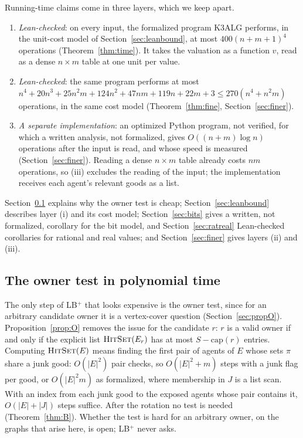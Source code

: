 \documentclass[runningheads,11pt]{llncs}
\newcommand{\LBp}{\texorpdfstring{\mbox{LB$^{+}$}}{LB+}}
\newcommand{\capa}{\mathrm{cap}}
\newcommand{\HitSet}{\textup{\textsc{HitSet}}}
\begin{document}
Running-time claims come in three layers, which we keep apart.
\begin{enumerate}
\item[(i)] \emph{Lean-checked}: on every input, the formalized program K3ALG performs, in the unit-cost model of Section~\ref{sec:leanbound}, at most $400(n+m+1)^4$ operations (Theorem~\ref{thm:time}). It takes the valuation as a function $v$, read as a dense $n\times m$ table at one unit per value.
\item[(ii)] \emph{Lean-checked}: the same program performs at most $n^4+20n^3+25n^2m+124n^2+47nm+119n+22m+3\le270(n^4+n^2m)$ operations, in the same cost model (Theorem~\ref{thm:fine}, Section~\ref{sec:finer}).
\item[(iii)] \emph{A separate implementation}: an optimized Python program, not verified, for which a written analysis, not formalized, gives $O((n+m)\log n)$ operations after the input is read, and whose speed is measured (Section~\ref{sec:finer}). Reading a dense $n\times m$ table already costs $nm$ operations, so (iii) excludes the reading of the input; the implementation receives each agent's relevant goods as a list.
\end{enumerate}
Section~\ref{sec:owner-time} explains why the owner test is cheap; Section~\ref{sec:leanbound} describes layer (i) and its cost model; Section~\ref{sec:bits} gives a written, not formalized, corollary for the bit model, and Section~\ref{sec:ratreal} Lean-checked corollaries for rational and real values; and Section~\ref{sec:finer} gives layers (ii) and (iii).

\subsection{The owner test in polynomial time}\label{sec:owner-time}

The only step of \LBp{} that looks expensive is the owner test, since for an arbitrary candidate owner it is a vertex-cover question (Section~\ref{sec:propO}). Proposition~\ref{prop:O} removes the issue for the candidate $r$: $r$ is a valid owner if and only if the explicit list $\HitSet(E_r)$ has at most $S-\capa(r)$ entries. Computing $\HitSet(E)$ means finding the first pair of agents of $E$ whose sets $\pi$ share a junk good: $O(|E|^2)$ pair checks, so $O(|E|^2+m)$ steps with a junk flag per good, or $O(|E|^2m)$ as formalized, where membership in $J$ is a list scan. With an index from each junk good to the exposed agents whose pair contains it, $O(|E|+|J|)$ steps suffice. After the rotation no test is needed (Theorem~\ref{thm:B}). Whether the test is hard for an arbitrary owner, on the graphs that arise here, is open; \LBp{} never asks.
\end{document}
